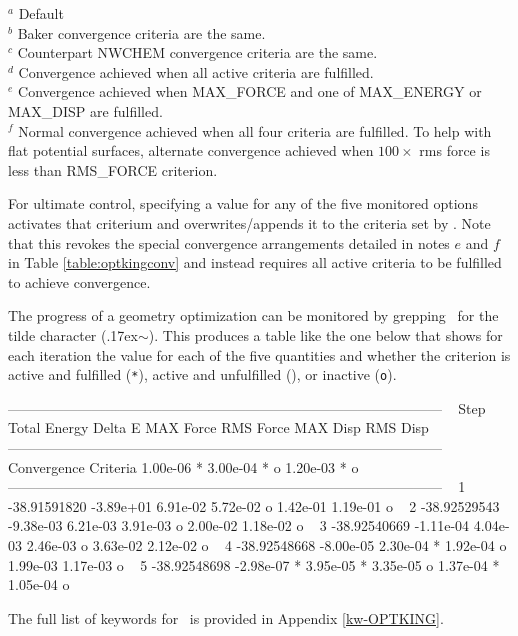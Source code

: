 \begin{table}[!htbp]
\begin{footnotesize}
\begin{center}
\end{center}
$^a$ Default \\
$^b$ Baker convergence criteria are the same. \\
$^c$ Counterpart NWCHEM convergence criteria are the same. \\
$^d$ Convergence achieved when all active criteria are fulfilled. \\
$^e$ Convergence achieved when MAX\_FORCE and one of MAX\_ENERGY or MAX\_DISP are fulfilled. \\
$^f$ Normal convergence achieved when all four criteria are fulfilled. To help with flat potential surfaces, alternate convergence achieved when $100\times$ rms force is less than RMS\_FORCE criterion.
\end{footnotesize}
\end{table}

For ultimate control, specifying a value for any of the five monitored options activates that
criterium and overwrites/appends it to the criteria set by .
Note that this revokes the special convergence arrangements detailed in notes $e$ and $f$ in 
Table \ref{table:optkingconv} and instead requires all active criteria to be fulfilled to 
achieve convergence.

The progress of a geometry optimization can be monitored by grepping \outputdat\ for the
tilde character ({\raise.17ex\hbox{$\scriptstyle\sim$}}). This produces a table like the one below that shows
for each iteration the value for each of the five quantities and whether the criterion
is active and fulfilled (\texttt{*}), active and unfulfilled (\texttt{\;\;}), or inactive (\texttt{o}).
\begin{smallSnippet}
--------------------------------------------------------------------------------------------- ~
 Step     Total Energy     Delta E     MAX Force     RMS Force      MAX Disp      RMS Disp    ~
--------------------------------------------------------------------------------------------- ~
  Convergence Criteria    1.00e-06 *    3.00e-04 *             o    1.20e-03 *             o  ~
--------------------------------------------------------------------------------------------- ~
    1     -38.91591820   -3.89e+01      6.91e-02      5.72e-02 o    1.42e-01      1.19e-01 o  ~
    2     -38.92529543   -9.38e-03      6.21e-03      3.91e-03 o    2.00e-02      1.18e-02 o  ~
    3     -38.92540669   -1.11e-04      4.04e-03      2.46e-03 o    3.63e-02      2.12e-02 o  ~
    4     -38.92548668   -8.00e-05      2.30e-04 *    1.92e-04 o    1.99e-03      1.17e-03 o  ~
    5     -38.92548698   -2.98e-07 *    3.95e-05 *    3.35e-05 o    1.37e-04 *    1.05e-04 o  ~
\end{smallSnippet}

The full list of keywords for \PSIoptking\ is provided in Appendix \ref{kw-OPTKING}.

